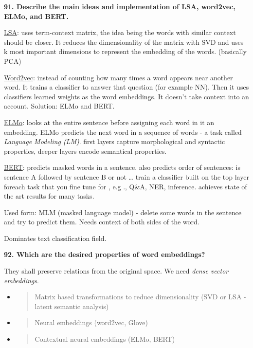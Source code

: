 \textbf{91. Describe the main ideas and implementation of LSA, word2vec,
ELMo, and BERT.}

\underline{LSA}: uses term-context matrix, the idea being the words with
similar context should be closer. It reduces the dimensionality of the
matrix with SVD and uses k most important dimensions to represent the
embedding of the words. (basically PCA)

\underline{Word2vec}: instead of counting how many times a word appears
near another word. It trains a classifier to answer that question (for
example NN). Then it uses classifiers learned weights as the word
embeddings. It doesn't take context into an account. Solution: ELMo and
BERT.

\underline{ELMo}: looks at the entire sentence before assigning each
word in it an embedding. ELMo predicts the next word in a sequence of
words - a task called \emph{Language Modeling (LM)}. first layers
capture morphological and syntactic properties, deeper layers encode
semantical properties.

\underline{BERT}: predicts masked words in a sentence. also predicts
order of sentences: is sentence A followed by sentence B or not \ldots{}
train a classifier built on the top layer foreach task that you fine
tune for , e.g ., Q\&A, NER, inference. achieves state of the art
results for many tasks.

Used form: MLM (masked language model) - delete some words in the
sentence and try to predict them. Needs context of both sides of the
word.

Dominates text classification field.

\textbf{92. Which are the desired properties of word embeddings?}

They shall preserve relations from the original space. We need
\emph{dense vector embeddings}.

\begin{itemize}
\item
  \begin{quote}
  Matrix based transformations to reduce dimensionality (SVD or LSA -
  latent semantic analysis)
  \end{quote}
\item
  \begin{quote}
  Neural embeddings (word2vec, Glove)
  \end{quote}
\item
  \begin{quote}
  Contextual neural embeddings (ELMo, BERT)
  \end{quote}
\end{itemize}

